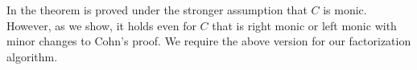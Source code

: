 \begin{remark}
  In \cite{Cohnfir} the theorem is proved under the stronger
  assumption that $C$ is monic. However, as we show, it holds even for
  $C$ that is right monic or left monic with minor changes to Cohn's
  proof. We require the above version for our factorization algorithm.
\end{remark}

%
%
%
%

